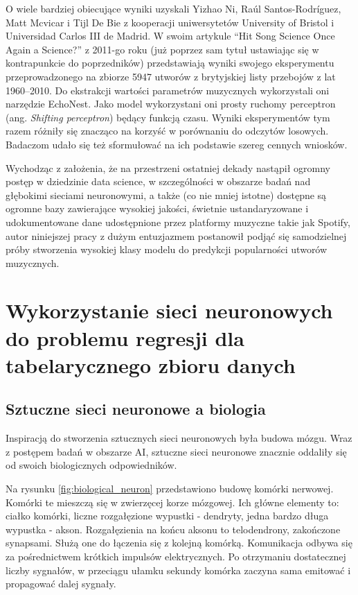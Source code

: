 \documentclass[a4paper,12pt]{article}
\numberwithin{figure}{section}
\begin{document}
    \bigskip

    O wiele bardziej obiecujące wyniki uzyskali Yizhao Ni, Raúl Santos-Rodríguez, Matt Mcvicar i Tijl De Bie z kooperacji uniwersytetów University of Bristol i Universidad Carlos III de Madrid. W swoim artykule ``Hit Song Science Once Again a Science?'' z 2011-go roku\cite{HitSongScienceOnceAgain2011} (już poprzez sam tytuł ustawiając się w kontrapunkcie do poprzedników) przedstawiają wyniki swojego eksperymentu przeprowadzonego na zbiorze 5947 utworów z brytyjskiej listy przebojów z lat 1960--2010. Do ekstrakcji wartości parametrów muzycznych wykorzystali oni narzędzie EchoNest. Jako model wykorzystani oni prosty ruchomy perceptron (ang. \textit{Shifting perceptron}) będący funkcją czasu. Wyniki eksperymentów tym razem różniły się znacząco na korzyść w porównaniu do odczytów losowych. Badaczom udało się też sformułować na ich podstawie szereg cennych wniosków.

    \bigskip

    Wychodząc z założenia, że na przestrzeni ostatniej dekady nastąpił ogromny postęp w dziedzinie data science, w szczególności w obszarze badań nad głębokimi sieciami neuronowymi, a także (co nie mniej istotne) dostępne są ogromne bazy zawierające wysokiej jakości, świetnie ustandaryzowane i udokumentowane dane udostępnione przez platformy muzyczne takie jak Spotify, autor niniejszej pracy z dużym entuzjazmem postanowił podjąć się samodzielnej próby stworzenia wysokiej klasy modelu do predykcji popularności utworów muzycznych.

    \newpage


    \section{Wykorzystanie sieci neuronowych do problemu regresji dla tabelarycznego zbioru danych}

    \subsection{Sztuczne sieci neuronowe a biologia}

    Inspiracją do stworzenia sztucznych sieci neuronowych była budowa mózgu. Wraz z postępem badań w obszarze AI, sztuczne sieci neuronowe znacznie oddaliły się od swoich biologicznych odpowiedników\cite{UczenieMaszynowe2018}.

    \bigskip

    Na rysunku \ref{fig:biological_neuron} przedstawiono budowę komórki nerwowej. Komórki te mieszczą się w zwierzęcej korze mózgowej. Ich główne elementy to: ciałko komórki, liczne rozgałęzione wypustki - dendryty, jedna bardzo długa wypustka - akson. Rozgałęzienia na końcu aksonu to telodendrony, zakończone synapsami. Służą one do łączenia się z kolejną komórką. Komunikacja odbywa się za pośrednictwem krótkich impulsów elektrycznych. Po otrzymaniu dostatecznej liczby sygnałów, w przeciągu ułamku sekundy komórka zaczyna sama emitować i propagować dalej sygnały\cite{UczenieMaszynowe2018}.
\end{document}
